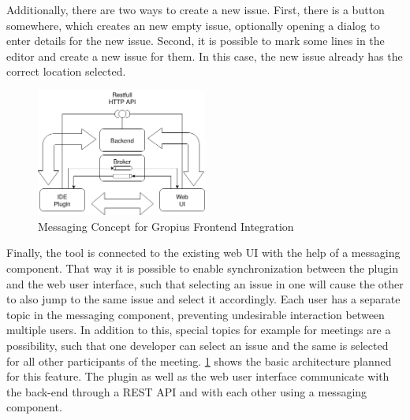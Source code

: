 Additionally, there are two ways to create a new issue.
First, there is a button somewhere, which creates an new empty issue, 
optionally opening a dialog to enter details for the new issue.
Second, it is possible to mark some lines in the editor and create a new issue for them.
In this case, the new issue already has the correct location selected.

\begin{figure}[!h]
	\centering
	\includegraphics[width=0.5\textwidth]{graphics/concept_gropius_frontend_messaging.png}
	\caption{Messaging Concept for Gropius Frontend Integration}
	\label{fig:c3:concept_gropius_messaging}
\end{figure}

Finally, the tool is connected to the existing web \gls{UI} with the help of a messaging component.
That way it is possible to enable synchronization between the plugin and the web user interface, 
such that selecting an issue in one will cause the other to also jump to the same issue and select it accordingly. 
Each user has a separate topic in the messaging component, preventing undesirable interaction between multiple users. 
In addition to this, special topics for example for meetings are a possibility, 
such that one developer can select an issue and the same is selected for all other participants of the meeting. 
\cref{fig:c3:concept_gropius_messaging} shows the basic architecture planned for this feature. 
The plugin as well as the web user interface communicate with the back-end through a \gls{REST} \gls{API} and with each other using a messaging component.
